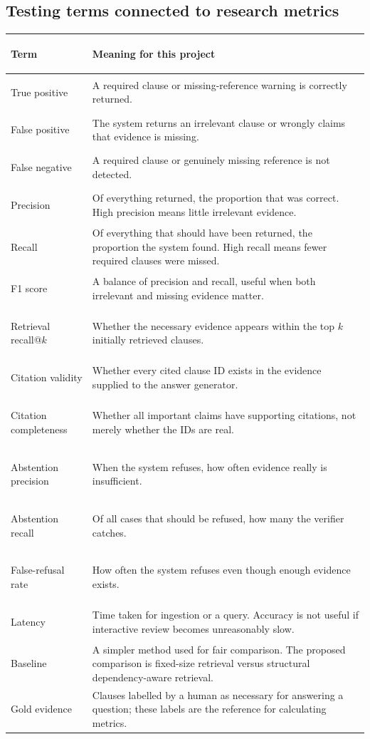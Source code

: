 \documentclass[11pt,letterpaper]{article}
\begin{document}
\subsection{Testing terms connected to research metrics}
\begin{longtable}{>{\bfseries\raggedright\arraybackslash}p{}>{\raggedright\arraybackslash}p{}}
\toprule
Term & Meaning for this project\\
\midrule
True positive & A required clause or missing-reference warning is correctly returned.\\
False positive & The system returns an irrelevant clause or wrongly claims that evidence is missing.\\
False negative & A required clause or genuinely missing reference is not detected.\\
Precision & Of everything returned, the proportion that was correct. High precision means little irrelevant evidence.\\
Recall & Of everything that should have been returned, the proportion the system found. High recall means fewer required clauses were missed.\\
F1 score & A balance of precision and recall, useful when both irrelevant and missing evidence matter.\\
Retrieval recall@$k$ & Whether the necessary evidence appears within the top $k$ initially retrieved clauses.\\
Citation validity & Whether every cited clause ID exists in the evidence supplied to the answer generator.\\
Citation completeness & Whether all important claims have supporting citations, not merely whether the IDs are real.\\
Abstention precision & When the system refuses, how often evidence really is insufficient.\\
Abstention recall & Of all cases that should be refused, how many the verifier catches.\\
False-refusal rate & How often the system refuses even though enough evidence exists.\\
Latency & Time taken for ingestion or a query. Accuracy is not useful if interactive review becomes unreasonably slow.\\
Baseline & A simpler method used for fair comparison. The proposed comparison is fixed-size retrieval versus structural dependency-aware retrieval.\\
Gold evidence & Clauses labelled by a human as necessary for answering a question; these labels are the reference for calculating metrics.\\
\bottomrule
\end{longtable}
\end{document}
